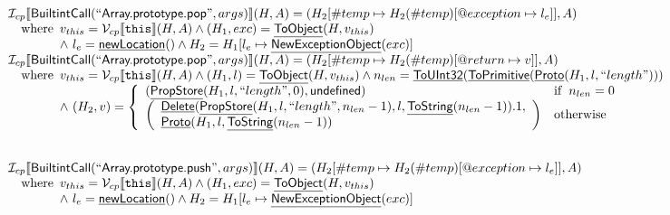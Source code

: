\documentclass{article}
\makeatletter
\newcommand{\SF}[1]{\mbox{\textsf{#1}}}
\newcommand{\TT}[1]{\mbox{\texttt{#1}}}
\newcommand{\wherec}[1]{{\rm where}\begin{array}[t]{l}#1\end{array}}
\newcommand{\ifc}[1]{{\rm if}\begin{array}[t]{l}#1\end{array}}
\newcommand{\owc}{{\rm otherwise}}
\newcommand{\I}{\mathcal{I}}
\newcommand{\V}{\mathcal{V}}
\newcommand{\lbr}{\llbracket}
\newcommand{\rbr}{\rrbracket}
\newcommand{\hf}[1]{\underline{\sf #1}}
\newcommand{\varloc}[1]{\##1}
\newcommand{\varprop}[1]{@#1}
\makeatother
\begin{document}
\[
\begin{array}{l}

\I _{cp}\lbr \SF{BuiltintCall}(``\SF{Array.prototype.pop}",args)\rbr(H,A)
 = (H_2[\varloc{temp}\mapsto H_2(\varloc{temp})[\varprop{exception}\mapsto l_e]], A) \\
\quad\wherec{
  v_{this} = \V _{cp}\lbr \TT{this}\rbr (H,A) \land (H_1,exc) = \hf{ToObject}(H,v_{this})\\
  \land\ l_e = \hf{newLocation}() \land H_2=H_1[l_e\mapsto\hf{NewExceptionObject}(exc)] 
  }\\
  
\I _{cp}\lbr \SF{BuiltintCall}(``\SF{Array.prototype.pop}",args)\rbr(H,A)
 = (H_2[\varloc{temp}\mapsto H_2(\varloc{temp})[\varprop{return}\mapsto v]], A) \\
\quad\wherec{
  v_{this} = \V _{cp}\lbr \TT{this}\rbr (H,A) \land (H_1,l) = \hf{ToObject}(H,v_{this})
  \land n_{len} = \hf{ToUInt32}(\hf{ToPrimitive}(\hf{Proto}(H_1, l, ``length")))\\
  \land\ (H_2, v) = \left\{\begin{array}{ll}
    (\hf{PropStore}(H_1, l, ``length", 0), \SF{undefined}) & \ifc{n_{len} = 0}\\
    \left(\begin{array}{l}
      \hf{Delete}(\hf{PropStore}(H_1, l, ``length", n_{len} -1),l, \hf{ToString}(n_{len}-1)).1,\\
      \hf{Proto}(H_1, l, \hf{ToString}(n_{len}-1))
    \end{array}\right)
     & \owc
    \end{array}\right.
  }\\
\\\\



\I _{cp}\lbr \SF{BuiltintCall}(``\SF{Array.prototype.push}",args)\rbr(H,A)
 = (H_2[\varloc{temp}\mapsto H_2(\varloc{temp})[\varprop{exception}\mapsto l_e]], A) \\
\quad\wherec{
  v_{this} = \V _{cp}\lbr \TT{this}\rbr (H,A) \land (H_1,exc) = \hf{ToObject}(H,v_{this})\\
  \land\ l_e = \hf{newLocation}() \land H_2=H_1[l_e\mapsto\hf{NewExceptionObject}(exc)] 
  }\\
  

\end{array}\]
\end{document}
